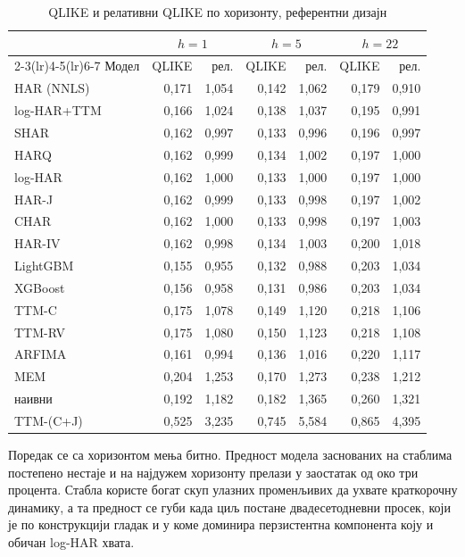 \begin{table}[htbp]
\centering
\caption{QLIKE и релативни QLIKE по хоризонту, референтни дизајн}
\label{tab:glavna-horizonti}
\begin{tabular}{lrrrrrr}
\toprule
& \multicolumn{2}{c}{$h = 1$} & \multicolumn{2}{c}{$h = 5$} & \multicolumn{2}{c}{$h = 22$} \\
\cmidrule(lr){2-3}\cmidrule(lr){4-5}\cmidrule(lr){6-7}
Модел & QLIKE & рел. & QLIKE & рел. & QLIKE & рел. \\
\midrule
HAR (NNLS)     & 0,171 & 1,054 & 0,142 & 1,062 & 0,179 & 0,910 \\
log-HAR+TTM   & 0,166 & 1,024 & 0,138 & 1,037 & 0,195 & 0,991 \\
SHAR          & 0,162 & 0,997 & 0,133 & 0,996 & 0,196 & 0,997 \\
HARQ          & 0,162 & 0,999 & 0,134 & 1,002 & 0,197 & 1,000 \\
log-HAR       & 0,162 & 1,000 & 0,133 & 1,000 & 0,197 & 1,000 \\
HAR-J         & 0,162 & 0,999 & 0,133 & 0,998 & 0,197 & 1,002 \\
CHAR          & 0,162 & 1,000 & 0,133 & 0,998 & 0,197 & 1,003 \\
HAR-IV        & 0,162 & 0,998 & 0,134 & 1,003 & 0,200 & 1,018 \\
LightGBM      & 0,155 & 0,955 & 0,132 & 0,988 & 0,203 & 1,034 \\
XGBoost       & 0,156 & 0,958 & 0,131 & 0,986 & 0,203 & 1,034 \\
TTM-C         & 0,175 & 1,078 & 0,149 & 1,120 & 0,218 & 1,106 \\
TTM-RV        & 0,175 & 1,080 & 0,150 & 1,123 & 0,218 & 1,108 \\
ARFIMA        & 0,161 & 0,994 & 0,136 & 1,016 & 0,220 & 1,117 \\
MEM           & 0,204 & 1,253 & 0,170 & 1,273 & 0,238 & 1,212 \\
наивни        & 0,192 & 1,182 & 0,182 & 1,365 & 0,260 & 1,321 \\
TTM-(C+J)     & 0,525 & 3,235 & 0,745 & 5,584 & 0,865 & 4,395 \\
\bottomrule
\end{tabular}
\end{table}

Поредак се са хоризонтом мења битно. Предност модела заснованих на стаблима постепено
нестаје и на најдужем хоризонту прелази у заостатак од око три процента. Стабла користе
богат скуп улазних променљивих да ухвате краткорочну динамику, а та предност се губи
када циљ постане двадесетодневни просек, који је по конструкцији гладак и у коме
доминира перзистентна компонента коју и обичан log-HAR хвата.

